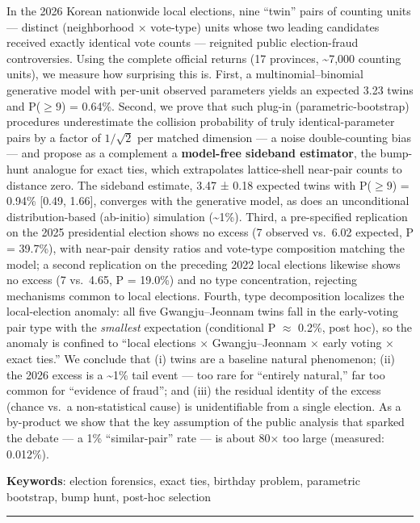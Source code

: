 \documentclass[
  11pt,
]{article}
\begin{document}
In the 2026 Korean nationwide local elections, nine ``twin'' pairs of
counting units --- distinct (neighborhood × vote-type) units whose two
leading candidates received exactly identical vote counts --- reignited
public election-fraud controversies. Using the complete official returns
(17 provinces, \textasciitilde7,000 counting units), we measure how
surprising this is. First, a multinomial--binomial generative model with
per-unit observed parameters yields an expected 3.23 twins and
P(\(\geq 9\)) = 0.64\%. Second, we prove that such plug-in
(parametric-bootstrap) procedures underestimate the collision
probability of truly identical-parameter pairs by a factor of
\(1/\sqrt{2}\) per matched dimension --- a noise double-counting bias
--- and propose as a complement a \textbf{model-free sideband
estimator}, the bump-hunt analogue for exact ties, which extrapolates
lattice-shell near-pair counts to distance zero. The sideband estimate,
3.47 ± 0.18 expected twins with P(\(\geq 9\)) = 0.94\% {[}0.49, 1.66{]},
converges with the generative model, as does an unconditional
distribution-based (ab-initio) simulation (\textasciitilde1\%). Third, a
pre-specified replication on the 2025 presidential election shows no
excess (7 observed vs.~6.02 expected, P = 39.7\%), with near-pair
density ratios and vote-type composition matching the model; a second
replication on the preceding 2022 local elections likewise shows no
excess (7 vs.~4.65, P = 19.0\%) and no type concentration, rejecting
mechanisms common to local elections. Fourth, type decomposition
localizes the local-election anomaly: all five Gwangju--Jeonnam twins
fall in the early-voting pair type with the \emph{smallest} expectation
(conditional P \(\approx\) 0.2\%, post hoc), so the anomaly is confined
to ``local elections × Gwangju--Jeonnam × early voting × exact ties.''
We conclude that (i) twins are a baseline natural phenomenon; (ii) the
2026 excess is a \textasciitilde1\% tail event --- too rare for
``entirely natural,'' far too common for ``evidence of fraud''; and
(iii) the residual identity of the excess (chance vs.~a non-statistical
cause) is unidentifiable from a single election. As a by-product we show
that the key assumption of the public analysis that sparked the debate
--- a 1\% ``similar-pair'' rate --- is about 80× too large (measured:
0.012\%).

\textbf{Keywords}: election forensics, exact ties, birthday problem,
parametric bootstrap, bump hunt, post-hoc selection

\begin{center}\rule{0.5\linewidth}{0.5pt}\end{center}
\end{document}
